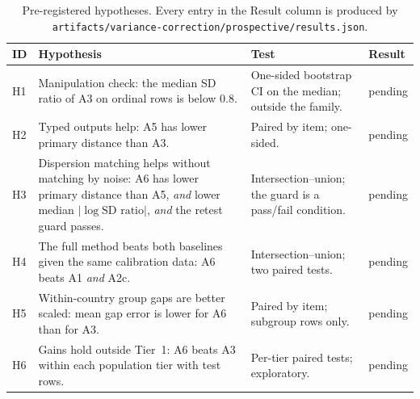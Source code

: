 \documentclass[11pt]{article}
\begin{document}
\begin{table}[t]
\centering
\small
\begin{tabular}{@{}lL{6.6cm}L{5.2cm}l@{}}
\toprule
ID & Hypothesis & Test & Result \\
\midrule
H1 & Manipulation check: the median SD ratio of A3 on ordinal rows is below 0.8. & One-sided bootstrap CI on the median; outside the family. & pending \\
H2 & Typed outputs help: A5 has lower primary distance than A3. & Paired by item; one-sided. & pending \\
H3 & Dispersion matching helps without matching by noise: A6 has lower primary distance than A5, \emph{and} lower median $\lvert\log \text{SD ratio}\rvert$, \emph{and} the retest guard passes. & Intersection--union; the guard is a pass/fail condition. & pending \\
H4 & The full method beats both baselines given the same calibration data: A6 beats A1 \emph{and} A2c. & Intersection--union; two paired tests. & pending \\
H5 & Within-country group gaps are better scaled: mean gap error is lower for A6 than for A3. & Paired by item; subgroup rows only. & pending \\
H6 & Gains hold outside Tier~1: A6 beats A3 within each population tier with test rows. & Per-tier paired tests; exploratory. & pending \\
\bottomrule
\end{tabular}
\caption{Pre-registered hypotheses. Every entry in the Result column is produced by \texttt{artifacts/variance-correction/prospective/results.json}.}
\label{tab:hyp}
\end{table}
\end{document}
